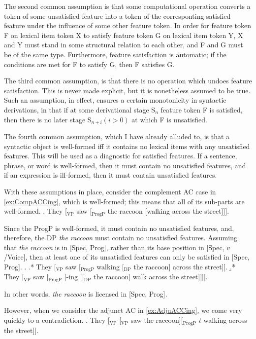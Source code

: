 \documentclass[MilwayThesis]{subfiles}
\begin{document}
The second common assumption is that some computational operation converts a token of some unsatisfied feature into a token of the corresponting satisfied feature under the influence of some other feature token.
In order for feature token F on lexical item token X to satisfy feature token G on lexical item token Y, X and Y must stand in some structural relation to each other, and F and G must be of the same type.
Furthermore, feature satisfaction is automatic; if the conditions are met for F to satisfy G, then F satisfies G.

The third common assumption, is that there is no operation which undoes feature satisfaction.
This is never made explicit, but it is nonetheless assumed to be true.
Such an assumption, in effect, ensures a certain monotonicity in syntactic derivations, in that if at some derivational stage S$_n$ feature token F is satisfied, then there is no later stage S$_{n+i} (i > 0)$ at which F is unsatisfied.

The fourth common assumption, which I have already alluded to, is that a syntactic object is well-formed iff it contains no lexical items with any unsatisfied features.
This will be used as a diagnostic for satisfied features.
If a sentence, phrase, or word is well-formed, then it must contain no unsatisfied features, and if an expression is ill-formed, then it must contain unsatisfied features.

With these assumptions in place, consider the complement AC case in \cref{ex:CompACCing}, which is well-formed; this means that all of its sub-parts are well-formed.
\ex. They [$_\text{VP}$ saw [$_\text{ProgP}$ the raccoon [walking across the street]]].\label{ex:CompACCing}

Since the ProgP is well-formed, it must contain no unsatisfied features, and, therefore, the DP \textit{the raccoon} must contain no unsatisfied features.
Assuming that \textit{the raccoon} is in [Spec, Prog], rather than its base position in [Spec, $v$/Voice], then at least one of its unsatisfied features can only be satisfied in [Spec, Prog]. 
\ex.
\a.* They [$_\text{VP}$ saw [$_\text{ProgP}$ walking [$_\text{DP}$ the raccoon] across the street]].
\b.* They [$_\text{VP}$ saw [$_\text{ProgP}$ [-ing [[$_\text{DP}$ the raccoon] walk across the street]]]].

In other words, \textit{the raccoon} is licensed in [Spec, Prog].

However, when we consider the adjunct AC in \cref{ex:AdjuACCing}, we come very quickly to a contradiction.
\ex. They [$_\text{VP}$ [$_\text{VP}$ saw the raccoon][$_\text{ProgP}$ $t$ walking across the street]].\label{ex:AdjuACCing}
\end{document}
